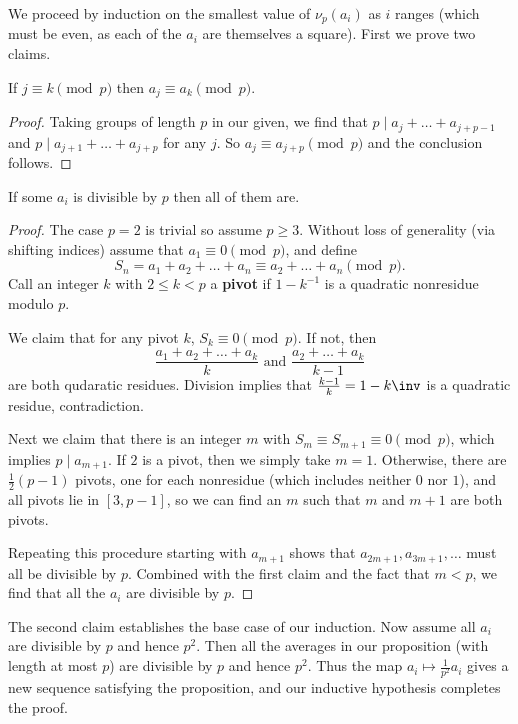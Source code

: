 \documentclass[11pt]{scrartcl}
\begin{document}
We proceed by induction on the smallest value of $\nu_p(a_i)$ as $i$ ranges
(which must be even, as each of the $a_i$ are themselves a square).
First we prove two claims.

\begin{claim*}
  If $j \equiv k \pmod p$ then $a_j \equiv a_k \pmod{p}$.
\end{claim*}
\begin{proof}
  Taking groups of length $p$ in our given,
  we find that $p \mid a_j +\dots + a_{j+p-1}$
  and $p \mid a_{j+1} + \dots + a_{j+p}$ for any $j$.
  So $a_j \equiv a_{j+p} \pmod p$ and the conclusion follows.
\end{proof}

\begin{claim*}
  If some $a_i$ is divisible by $p$ then all of them are.
\end{claim*}
\begin{proof}
  The case $p=2$ is trivial so assume $p \ge 3$.
  Without loss of generality (via shifting indices)
  assume that $a_1 \equiv 0 \pmod{p}$, and define
  \[ S_n = a_1 + a_2 + \dots + a_n \equiv a_2 + \dots + a_n \pmod{p}. \]
  Call an integer $k$ with $2 \le k < p$ a
  \textbf{pivot} if $1-k^{-1}$ is a quadratic nonresidue modulo $p$.

  We claim that for any pivot $k$, $S_k \equiv 0 \pmod{p}$.
  If not, then
  \[ \frac{a_1 + a_2 + \dots + a_k}{k}
    \text{ and } \frac{a_2 + \dots + a_k}{k-1} \]
  are both qudaratic residues.
  Division implies that $\frac{k-1}{k} = 1 - k\inv$ is a
  quadratic residue, contradiction.

  Next we claim that there is an integer $m$
  with $S_m \equiv S_{m+1} \equiv 0 \pmod{p}$,
  which implies $p \mid a_{m+1}$.
  If $2$ is a pivot, then we simply take $m=1$.
  Otherwise, there are $\frac12(p-1)$ pivots,
  one for each nonresidue (which includes neither $0$ nor $1$),
  and all pivots lie in $[3,p-1]$,
  so we can find an $m$ such that $m$ and $m+1$ are both pivots.

  Repeating this procedure starting with $a_{m+1}$
  shows that $a_{2m+1}, a_{3m+1}, \dots$ must all be divisible by $p$.
  Combined with the first claim and the fact that $m < p$,
  we find that all the $a_i$ are divisible by $p$.
\end{proof}

The second claim establishes the base case of our induction.
Now assume all $a_i$ are divisible by $p$ and hence $p^2$.
Then all the averages in our proposition (with length at most $p$)
are divisible by $p$ and hence $p^2$.
Thus the map $a_i \mapsto \frac{1}{p^2} a_i$ gives a new sequence
satisfying the proposition, and our inductive hypothesis completes the proof.
\end{document}
